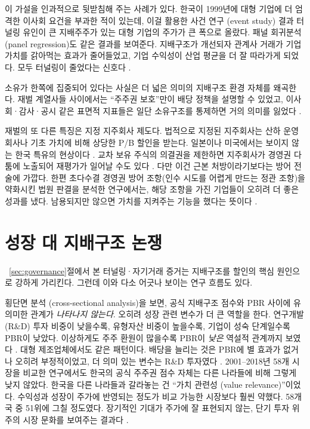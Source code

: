 \documentclass[12pt]{article}
\begin{document}
이 가설을 인과적으로 뒷받침해 주는 사례가 있다. 한국이 1999년에 대형 기업에 더 엄격한 이사회 요건을 부과한 적이 있는데, 이걸 활용한 사건 연구 (event study) 결과 터널링 유인이 큰 지배주주가 있는 대형 기업의 주가가 큰 폭으로 올랐다. 패널 회귀분석 (panel regression)도 같은 결과를 보여준다. 지배구조가 개선되자 관계사 거래가 기업 가치를 갉아먹는 효과가 줄어들었고, 기업 수익성이 산업 평균을 더 잘 따라가게 되었다. 모두 터널링이 줄었다는 신호다 \citep{black2015governance}.

소유가 한쪽에 집중되어 있다는 사실은 더 넓은 의미의 지배구조 환경 자체를 왜곡한다. 재벌 계열사들 사이에서는 ``주주권 보호''만이 배당 정책을 설명할 수 있었고, 이사회·감사·공시 같은 표면적 지표들은 일단 소유구조를 통제하면 거의 의미를 잃었다 \citep{njoku2026governance}.

재벌의 또 다른 특징은 지정 지주회사 제도다. 법적으로 지정된 지주회사는 산하 운영 회사나 기초 가치에 비해 상당한 P/B 할인을 받는다. 일본이나 미국에서는 보이지 않는 한국 특유의 현상이다 \citep{park2019holding}. 교차 보유 주식의 의결권을 제한하면 지주회사가 경영권 다툼에 노출되어 재평가가 일어날 수도 있다 \citep{park2025cross}. 다만 이건 근본 처방이라기보다는 방어 전술에 가깝다. 한편 초다수결 경영권 방어 조항(인수 시도를 어렵게 만드는 정관 조항)을 약화시킨 법원 판결을 분석한 연구에서는, 해당 조항을 가진 기업들이 오히려 더 좋은 성과를 냈다. 남용되지만 않으면 가치를 지켜주는 기능을 했다는 뜻이다 \citep{kim2022supermajority}.

\section{성장 대 지배구조 논쟁}
\label{sec:growth}

~\ref{sec:governance}절에서 본 터널링·자기거래 증거는 지배구조를 할인의 핵심 원인으로 강하게 가리킨다. 그런데 이와 다소 어긋나 보이는 연구 흐름도 있다.

횡단면 분석 (cross-sectional analysis)을 보면, 공식 지배구조 점수와 PBR 사이에 유의미한 관계가 \emph{나타나지 않는다}. 오히려 성장 관련 변수가 더 큰 역할을 한다. 연구개발(R\&D) 투자 비중이 낮을수록, 유형자산 비중이 높을수록, 기업이 성숙 단계일수록 PBR이 낮았다. 이상하게도 주주 환원이 많을수록 PBR이 \emph{낮은} 역설적 관계까지 보였다 \citep{yang2025korea}. 대형 제조업체에서도 같은 패턴이다. 배당을 늘리는 것은 PBR에 별 효과가 없거나 오히려 부정적이었고, 더 의미 있는 변수는 R\&D 투자였다 \citep{lee2025korea_pbr}. 2001--2018년 58개 시장을 비교한 연구에서도 한국의 공식 주주권 점수 자체는 다른 나라들에 비해 그렇게 낮지 않았다. 한국을 다른 나라들과 갈라놓는 건 ``가치 관련성 (value relevance)''이었다.  수익성과 성장이 주가에 반영되는 정도가 비교 가능한 시장보다 훨씬 약했다. 58개국 중 51위에 그칠 정도였다. 장기적인 기대가 주가에 잘 표현되지 않는, 단기 투자 위주의 시장 문화를 보여주는 결과다 \citep{kim2025causes}.
\end{document}
